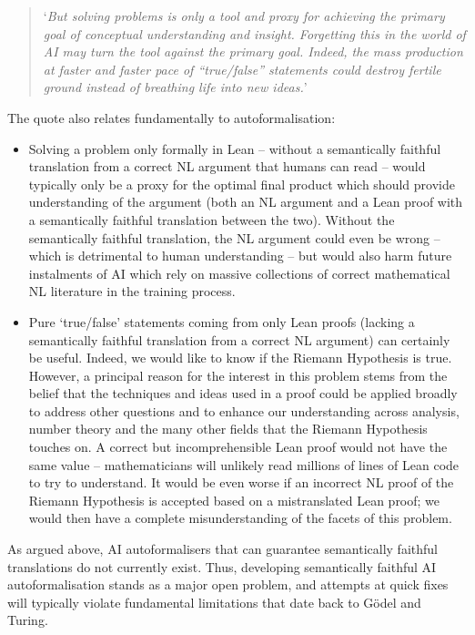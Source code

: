 \documentclass[10pt, a4paper, reqno]{amsart}
\numberwithin{equation}{section}
\theoremstyle{definition}
\theoremstyle{definition}
\begin{document}
\begin{quote}
	`\textit{But solving problems is only a tool and proxy for achieving the primary goal of conceptual understanding and insight. Forgetting this in the world of AI may turn the tool against the primary goal. Indeed, the mass production at faster and faster pace of ``true/false'' statements could destroy fertile ground instead of breathing life into new ideas.}'
\end{quote}
The quote also relates fundamentally to autoformalisation:
\begin{itemize}
\item[(i)] 
Solving a problem only formally in Lean -- without a semantically faithful translation from a correct NL argument that humans can read -- would typically only be a proxy for the optimal final product which should provide understanding of the argument (both an NL argument and a Lean proof  with a semantically faithful translation between the two). Without the semantically faithful translation, the NL argument could even be wrong -- which is detrimental to human understanding -- but would also harm future instalments of AI which rely on massive collections of correct mathematical NL literature in the training process.     

\item[(ii)]  Pure `true/false' statements coming from only Lean proofs (lacking a semantically faithful translation from a correct NL argument) can certainly be useful. Indeed, we would like to know if the Riemann Hypothesis is true. However, a principal reason for the interest in this problem stems from the belief that the techniques and ideas used in a proof could be applied broadly to address other questions and to enhance our understanding across analysis, number theory and the many other fields that the Riemann Hypothesis touches on. A correct but incomprehensible Lean proof would not have the same value -- mathematicians will unlikely read millions of lines of Lean code to try to understand. It would be even worse if an incorrect NL proof of the Riemann Hypothesis is accepted based on a mistranslated Lean proof; we would then have a complete misunderstanding of the facets of this problem.
\end{itemize}

As argued above, AI autoformalisers that can guarantee semantically faithful translations do not currently exist. Thus, developing semantically faithful AI autoformalisation stands as a major open problem, and attempts at quick fixes will typically violate fundamental limitations that date back to G\"odel and Turing.
\end{document}

